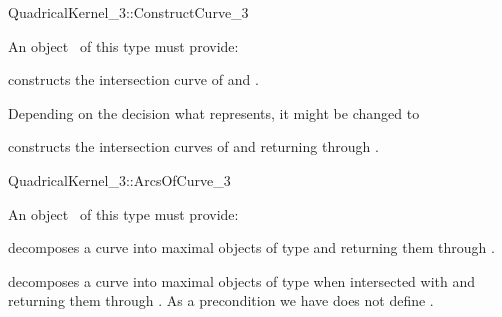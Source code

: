 
\begin{ccRefFunctionObjectConcept}{QuadricalKernel_3::ConstructCurve_3}


An object \ccVar\ of this type must provide:

{constructs the intersection curve of  and .}

\begin{ccAdvanced}

Depending on the decision what  represents,
it might be changed to 

{constructs the intersection curves of  and  returning through
  .}

\end{ccAdvanced}


\end{ccRefFunctionObjectConcept}


\begin{ccRefFunctionObjectConcept}{QuadricalKernel_3::ArcsOfCurve_3}



An object \ccVar\ of this type must provide:

{decomposes a curve into maximal objects of type 
 and returning them through .}

{decomposes a curve into maximal objects of type 
 when intersected with  
and returning them through . As a precondition we have  does
not define .}

\end{ccRefFunctionObjectConcept}

